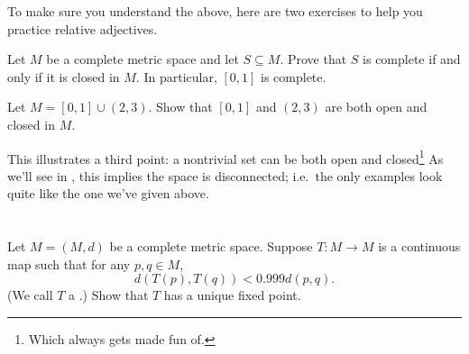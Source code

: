 To make sure you understand the above,
here are two exercises to help you practice relative adjectives.

\begin{exercise}
	Let $M$ be a complete metric space and let $S \subseteq M$.
	Prove that $S$ is complete if and only if it is closed in $M$.
	In particular, $[0,1]$ is complete.
\end{exercise}
\begin{exercise}
	Let $M = [0,1] \cup (2,3)$.
	Show that $[0,1]$ and $(2,3)$ are both open and closed in $M$.
\end{exercise}

This illustrates a third point:
a nontrivial set can be both open and closed\footnote{Which
	always gets made fun of.}
As we'll see in , this implies the space is disconnected;
i.e.\ the only examples look quite like the one we've given above.

\section{\problemhead}
\begin{dproblem}
	Let $M = (M,d)$ be a complete metric space.
	Suppose $T \colon M \to M$ is a continuous map such that for any $p,q \in M$,
	\[ d\left( T(p), T(q) \right) < 0.999 d(p,q). \]
	(We call $T$ a .)
	Show that $T$ has a unique fixed point.
\end{dproblem}

